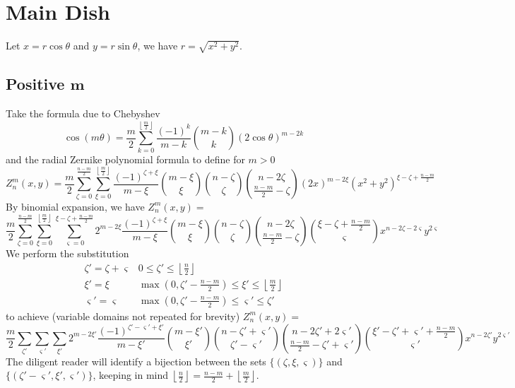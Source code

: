 \documentclass[showpacs,%
  nofootinbib,aps,superscriptaddress,%
  eqsecnum,prd,notitlepage,showkeys,10pt]{article}
\begin{document}
\section{Main Dish}
\label{sec:maindish}

Let $x=r\cos\theta$ and $y=r\sin\theta$, we have $r=\sqrt{x^2+y^2}$.

\subsection{Positive $\boldsymbol m$}
\label{sec:pm}
Take the formula due to Chebyshev
\[\cos(m\theta)=\frac m2\sum_{k=0}^{\left\lfloor\frac m2\right\rfloor}\frac{(-1)^k}{m-k}\binom{m-k}k(2\cos\theta)^{m-2k}\]
and the radial Zernike polynomial formula to define for $m>0$
\[Z_n^m(x,y)=\frac m2\sum_{\zeta=0}^{\frac{n-m}2}\sum_{\xi=0}^{\left\lfloor\frac m2\right\rfloor}\frac{(-1)^{\zeta+\xi}}{m-\xi}\binom{m-\xi}\xi\binom{n-\zeta}\zeta\binom{n-2\zeta}{\frac{n-m}2-\zeta}(2x)^{m-2\xi}\left(x^2+y^2\right)^{\xi-\zeta+\frac{n-m}2}\]
By binomial expansion, we have $Z_n^m(x,y)=$
\[\frac m2\sum_{\zeta=0}^{\frac{n-m}2}\sum_{\xi=0}^{\left\lfloor\frac m2\right\rfloor}\sum_{\varsigma=0}^{\xi-\zeta+\frac{n-m}2}2^{m-2\xi}\frac{(-1)^{\zeta+\xi}}{m-\xi}\binom{m-\xi}\xi\binom{n-\zeta}\zeta\binom{n-2\zeta}{\frac{n-m}2-\zeta}\binom{\xi-\zeta+\frac{n-m}2}\varsigma x^{n-2\zeta-2\varsigma}y^{2\varsigma}\]
We perform the substitution
\[\begin{array}{c|c}\zeta'=\zeta+\varsigma&0\leq\zeta'\leq\left\lfloor\frac n2\right\rfloor\\\xi'=\xi&\max\left(0,\zeta'-\frac{n-m}2\right)\leq\xi'\leq\left\lfloor\frac m2\right\rfloor\\\varsigma'=\varsigma&\max\left(0,\zeta'-\frac{n-m}2\right)\leq\varsigma'\leq\zeta'\end{array}\]
to achieve (variable domains not repeated for brevity) $Z_n^m(x,y)=$
\[\frac m2\sum_{\zeta'}\sum_{\varsigma'}\sum_{\xi'}2^{m-2\xi'}\frac{(-1)^{\zeta'-\varsigma'+\xi'}}{m-\xi'}\binom{m-\xi'}{\xi'}\binom{n-\zeta'+\varsigma'}{\zeta'-\varsigma'}\binom{n-2\zeta'+2\varsigma'}{\frac{n-m}2-\zeta'+\varsigma'}\binom{\xi'-\zeta'+\varsigma'+\frac{n-m}2}{\varsigma'}x^{n-2\zeta'}y^{2\varsigma'}\]
The diligent reader will identify a bijection between the sets $\{(\zeta,\xi,\varsigma)\}$ and $\{(\zeta'-\varsigma',\xi',\varsigma')\}$, keeping in mind $\left\lfloor\frac n2\right\rfloor=\frac{n-m}2+\left\lfloor\frac m2\right\rfloor$.
\end{document}
